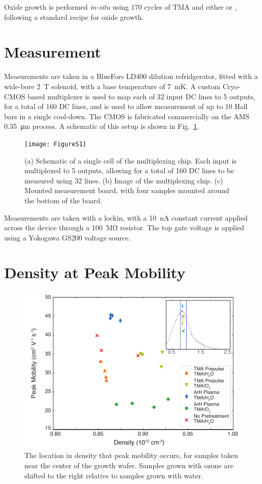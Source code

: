 Oxide growth is performed \emph{in-situ} using 170 cycles of TMA and either  or , following a standard recipe for oxide growth.

\section{\label{sec:surf_mulberry}Measurement}
Measurements are taken in a BlueFors LD400 dilution refridgerator, fitted with a wide-bore \SI{2}{\tesla} solenoid, with a base temperature of \SI{7}{\milli\kelvin}. A custom Cryo-CMOS based multiplexer is used to map each of 32 input DC lines to 5 outputs, for a total of 160 DC lines, and is used to allow measurement of up to 10 Hall bars in a single cool-down. The CMOS is fabricated commercially on the AMS \SI{0.35}{\micro\meter} process. A schematic of this setup is shown in Fig.~\ref{fig:surf_cmos}.

\begin{figure}
    \texttt{[image: FigureS1]}
    \caption[Measurement multiplexing setup]{\label{fig:surf_cmos} (a) Schematic of a single cell of the multiplexing chip. Each input is multiplexed to 5 outputs, allowing for a total of 160 DC lines to be measured using 32 lines. (b) Image of the multiplexing chip. (c) Mounted measurement board, with four samples mounted around the bottom of the board.}
\end{figure}

Measurements are taken with a lockin, with a \SI{10}{\nano\ampere} constant current applied across the device through a \SI{100}{\mega\ohm} resistor. The top gate voltage is applied using a Yokogawa GS200 voltage source.

\section{\label{sec:surf_mobden} Density at Peak Mobility}
\begin{figure}
    \includegraphics[width=0.65\linewidth]{FigureS2}
    \caption[Location in density of peak mobility]{\label{fig:surf_mobden} The location in density that peak mobility occurs, for samples taken near the center of the growth wafer. Samples grown with ozone are shifted to the right relative to samples grown with water.}
\end{figure}
